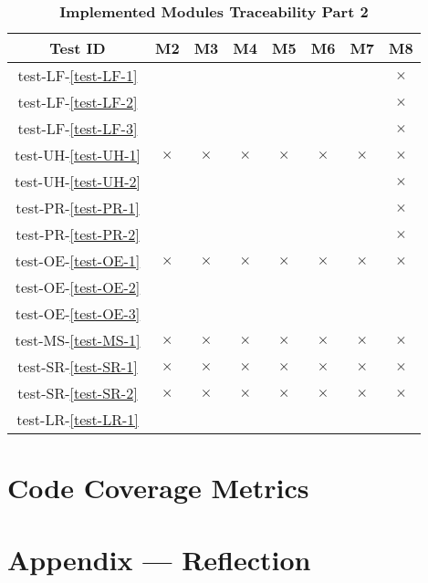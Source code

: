 \documentclass[12pt, titlepage]{article}
\begin{document}
\begin{table}[H]
\centering
\begin{tabular}{|c|c|c|c|c|c|c|c|}
\hline
Test ID & M2 & M3 & M4 & M5 & M6 & M7 & M8 \\
\hline
test-LF-\ref{test-LF-1} & & & & & & & $\times$ \\
\hline
test-LF-\ref{test-LF-2} & & & & & & & $\times$ \\
\hline
test-LF-\ref{test-LF-3} & & & & & & & $\times$ \\
\hline
test-UH-\ref{test-UH-1} & $\times$ & $\times$ & $\times$ & $\times$ & $\times$ & $\times$ & $\times$ \\
\hline
test-UH-\ref{test-UH-2} & & & & & & & $\times$ \\
\hline
test-PR-\ref{test-PR-1} & & & & & & & $\times$ \\
\hline
test-PR-\ref{test-PR-2} & & & & & & & $\times$ \\
\hline
test-OE-\ref{test-OE-1} & $\times$ & $\times$ & $\times$ & $\times$ & $\times$ & $\times$ & $\times$ \\
\hline
test-OE-\ref{test-OE-2} & & & & & & & \\
\hline
test-OE-\ref{test-OE-3} & & & & & & & \\
\hline
test-MS-\ref{test-MS-1} & $\times$ & $\times$ & $\times$ & $\times$ & $\times$ & $\times$ & $\times$ \\
\hline
test-SR-\ref{test-SR-1} & $\times$ & $\times$ & $\times$ & $\times$ & $\times$ & $\times$ & $\times$ \\
\hline
test-SR-\ref{test-SR-2} & $\times$ & $\times$ & $\times$ & $\times$ & $\times$ & $\times$ & $\times$ \\
\hline
test-LR-\ref{test-LR-1} & & & & & & & \\
\hline
\end{tabular}
\caption{\bf Implemented Modules Traceability Part 2}
\end{table}

\section{Code Coverage Metrics}




\newpage{}
\section*{Appendix --- Reflection}
\end{document}
